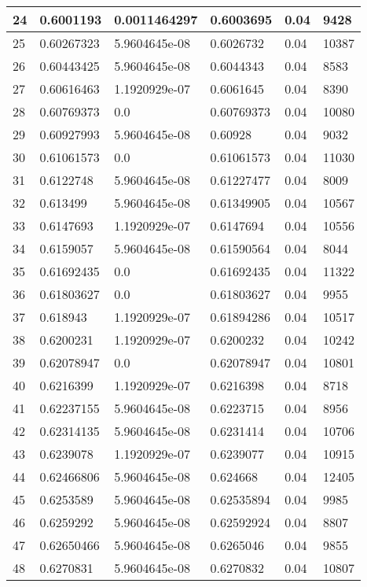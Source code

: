 \begin{longtable}{|l|l|l|l|l|l|}
24 & 0.6001193 & 0.0011464297 & 0.6003695 & 0.04 & 9428 \\ \hline 
25 & 0.60267323 & 5.9604645e-08 & 0.6026732 & 0.04 & 10387 \\ \hline 
26 & 0.60443425 & 5.9604645e-08 & 0.6044343 & 0.04 & 8583 \\ \hline 
27 & 0.60616463 & 1.1920929e-07 & 0.6061645 & 0.04 & 8390 \\ \hline 
28 & 0.60769373 & 0.0 & 0.60769373 & 0.04 & 10080 \\ \hline 
29 & 0.60927993 & 5.9604645e-08 & 0.60928 & 0.04 & 9032 \\ \hline 
30 & 0.61061573 & 0.0 & 0.61061573 & 0.04 & 11030 \\ \hline 
31 & 0.6122748 & 5.9604645e-08 & 0.61227477 & 0.04 & 8009 \\ \hline 
32 & 0.613499 & 5.9604645e-08 & 0.61349905 & 0.04 & 10567 \\ \hline 
33 & 0.6147693 & 1.1920929e-07 & 0.6147694 & 0.04 & 10556 \\ \hline 
34 & 0.6159057 & 5.9604645e-08 & 0.61590564 & 0.04 & 8044 \\ \hline 
35 & 0.61692435 & 0.0 & 0.61692435 & 0.04 & 11322 \\ \hline 
36 & 0.61803627 & 0.0 & 0.61803627 & 0.04 & 9955 \\ \hline 
37 & 0.618943 & 1.1920929e-07 & 0.61894286 & 0.04 & 10517 \\ \hline 
38 & 0.6200231 & 1.1920929e-07 & 0.6200232 & 0.04 & 10242 \\ \hline 
39 & 0.62078947 & 0.0 & 0.62078947 & 0.04 & 10801 \\ \hline 
40 & 0.6216399 & 1.1920929e-07 & 0.6216398 & 0.04 & 8718 \\ \hline 
41 & 0.62237155 & 5.9604645e-08 & 0.6223715 & 0.04 & 8956 \\ \hline 
42 & 0.62314135 & 5.9604645e-08 & 0.6231414 & 0.04 & 10706 \\ \hline 
43 & 0.6239078 & 1.1920929e-07 & 0.6239077 & 0.04 & 10915 \\ \hline 
44 & 0.62466806 & 5.9604645e-08 & 0.624668 & 0.04 & 12405 \\ \hline 
45 & 0.6253589 & 5.9604645e-08 & 0.62535894 & 0.04 & 9985 \\ \hline 
46 & 0.6259292 & 5.9604645e-08 & 0.62592924 & 0.04 & 8807 \\ \hline 
47 & 0.62650466 & 5.9604645e-08 & 0.6265046 & 0.04 & 9855 \\ \hline 
48 & 0.6270831 & 5.9604645e-08 & 0.6270832 & 0.04 & 10807 \\ \hline 

\end{longtable}
